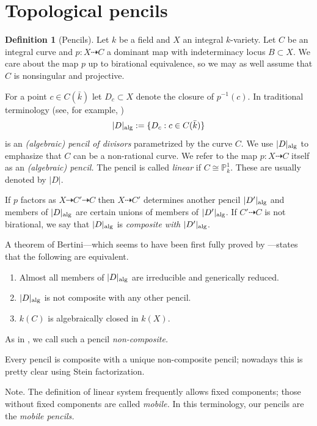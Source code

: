 \documentclass{amsart}
\theoremstyle{definition}
\newtheorem{defn}[thm]{Definition}
\theoremstyle{remark}
\newcommand{\p}[0]{{\mathbb P}}
\newcommand{\map}[0]{\dasharrow}
\begin{document}
\section{Topological pencils}\label{top.pencils.sec}






\begin{defn}[Pencils] \label{pencil.defn}
Let $k$ be a field and $X$  an integral $k$-variety.
Let  $C$  be an integral  curve and $p:X\map C$
a dominant map with  indeterminacy locus  $B\subset X$.
We care about the map $p$ up to birational equivalence, so we may as well assume that $C$ is nonsingular  and projective.


For a  point $c\in C(\bar k)$ let $D_c\subset X$ denote the closure of $p^{-1}(c)$.  In traditional terminology  (see, for example, \cite{zar-41}) 
$$
|D|_{\rm alg}:=\{D_c : c\in C(\bar k)\}
$$ 
is an {\it (algebraic) pencil of divisors} parametrized by the curve $C$.
We use $|D|_{\rm alg}$ to emphasize that  $C$ can be a non-rational curve.
We refer to the map $p:X\map C$ itself as an {\it (algebraic) pencil.}
The pencil is called {\it linear}
if $C\cong\p^1_k$. These are  usually denoted by $|D|$.

If $p$ factors as  $X\map C'\map C$ then $X\map C'$ determines another pencil $|D'|_{\rm alg}$ and members of  $|D|_{\rm alg}$ are certain unions of members of $|D'|_{\rm alg}$. If $C'\map C$ is not birational, we say that   $|D|_{\rm alg}$  is  {\it  composite with}  
$|D'|_{\rm alg}$.

A theorem of Bertini---which seems to have been first fully proved by \cite{vdW-36}---states that the following are equivalent.
\begin{enumerate}
\item Almost all members of $|D|_{\rm alg}$ are  irreducible and generically reduced.
\item  $|D|_{\rm alg}$  is  not  composite with any other pencil.
\item  $k(C)$ is algebraically closed in $k(X)$.
\end{enumerate}
 As in \cite{zar-41}, we call such a pencil {\it non-composite.}  

Every pencil is composite with a unique non-composite pencil;
nowadays this is  pretty clear 
 using Stein factorization.



Note. The  definition of linear system frequently allows fixed components; those without fixed components are called {\it mobile.} In this terminology,
 our pencils are the {\it mobile pencils.}
\end{defn}
\end{document}
